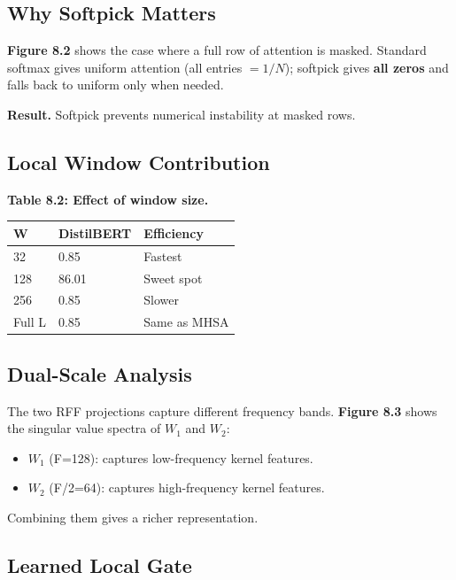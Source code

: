 \subsection{Why Softpick Matters}

\textbf{Figure 8.2} shows the case where a full row of attention is masked. 
Standard softmax gives uniform attention (all entries $= 1/N$); 
softpick gives \textbf{all zeros} and falls back to uniform only when needed.

\textbf{Result.} Softpick prevents numerical instability at masked rows.

\subsection{Local Window Contribution}

\textbf{Table 8.2: Effect of window size.}

\begin{table}[H]
\centering
\small
\begin{tabular}{lll}
\toprule
\textbf{W} & \textbf{DistilBERT} & \textbf{Efficiency} \\
\midrule
32 & 0.85 & Fastest \\
128 & 86.01 & Sweet spot \\
256 & 0.85 & Slower \\
Full L & 0.85 & Same as MHSA \\
\bottomrule
\end{tabular}
\end{table}

\subsection{Dual-Scale Analysis}

The two RFF projections capture different frequency bands. \textbf{Figure 8.3} 
shows the singular value spectra of $W_1$ and $W_2$:

\begin{itemize}
\item $W_1$ (F=128): captures low-frequency kernel features.
\item $W_2$ (F/2=64): captures high-frequency kernel features.

\end{itemize}
Combining them gives a richer representation.

\subsection{Learned Local Gate}

